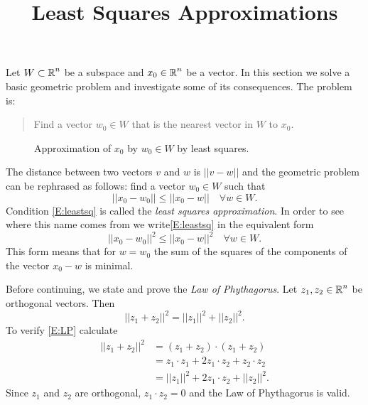 \documentclass{ximera}
\title{Least Squares Approximations}
\begin{document}
\begin{abstract}
\end{abstract}
\maketitle

  \label{S:LSA}

Let $W\subset\mbox{$\Bbb{R}$}^n$ be a subspace and $x_0\in\mbox{$\Bbb{R}$}^n$ be a vector.  In this
section we solve a basic geometric problem and investigate some of its
consequences.  The problem is:
\begin{quote}
Find a vector $w_0\in W$ that is the nearest vector in $W$ to $x_0$.
\end{quote}

\begin{figure}[htb]
        \centerline{%
        }
        \caption{Approximation of $x_0$ by $w_0\in W$ by least squares.}
        \label{F:nearest}
\end{figure}


The distance between two vectors
$v$ and $w$ is $||v-w||$ and the geometric
problem can be rephrased as follows: find a vector $w_0\in W$ such that
\begin{equation}  \label{E:leastsq}
||x_0-w_0||\leq ||x_0-w|| \quad \forall w\in W.
\end{equation}
Condition \eqref{E:leastsq} is called the
{\em least squares approximation}.
In order to see where this name comes from we write\eqref{E:leastsq} in the
equivalent form
\[
||x_0-w_0||^2\leq ||x_0-w||^2 \quad \forall w\in W.
\]
This form means that for $w=w_0$ the sum of the squares of the
components of the vector $x_0-w$ is minimal.

Before continuing, we state and prove the {\em Law of Phythagorus\/}.
  Let $z_1,z_2\in\mbox{$\Bbb{R}$}^n$ be orthogonal vectors.  Then 
\begin{equation} \label{E:LP}
||z_1+z_2||^2 = ||z_1||^2 + ||z_2||^2.
\end{equation}
To verify \eqref{E:LP} calculate 
\begin{align*}
  ||z_1+z_2||^2&=(z_1+z_2)\cdot(z_1+z_2) \\
  &=z_1\cdot z_1 +2z_1\cdot z_2+z_2\cdot z_2 \\
  &=||z_1||^2 + 2z_1\cdot z_2 +||z_2||^2.
\end{align*}
Since $z_1$ and $z_2$ are orthogonal, $z_1\cdot z_2=0$ and the Law of 
Phythagorus is valid.
\end{document}
